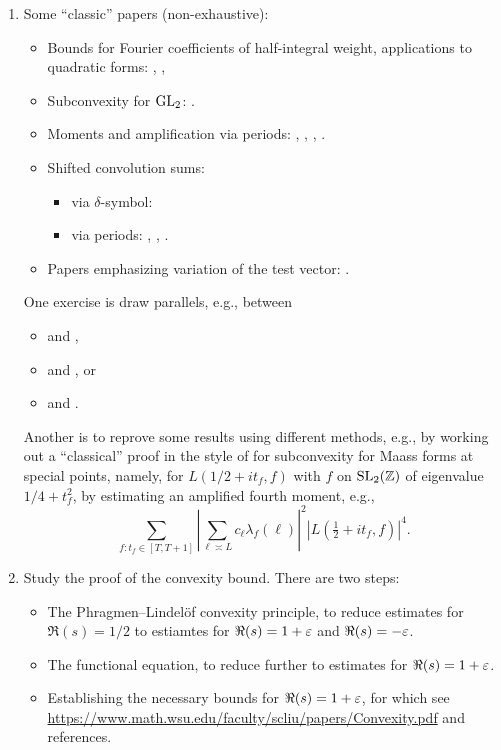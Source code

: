 \documentclass[reqno]{amsart} 
\begin{document}
\begin{enumerate}
\item Some ``classic'' papers (non-exhaustive):
  \begin{itemize}
  \item Bounds for Fourier coefficients of half-integral weight, applications to quadratic forms: \cite{MR870736}, \cite{MR931205}, \cite{MR1437494}
  \item Subconvexity for $\operatorname{GL}_2$: \cite{DFI93} \cite{DFI94} \cite{DFI01}.
  \item Moments and amplification via periods:  \cite{venkatesh-2005}, \cite{michel-2009}, \cite{iwan-sar}, \cite{MR780071}.
  \item Shifted convolution sums:
    \begin{itemize}
    \item via $\delta$-symbol: \cite{DFI93}
    \item via periods: \cite{Sar01}, \cite{MR2437682}, \cite{2024arXiv2404.10692}.
    \end{itemize}
  \item Papers emphasizing variation of the test vector:   \cite{MR2373356, MR2726097, venkatesh-2005}.
  \end{itemize}
  One exercise is draw parallels, e.g., between
  \begin{itemize}
  \item \cite[Thm 5.1]{michel-2009} and \cite{DFI93},
  \item \cite[\S4]{venkatesh-2005} and \cite{DFI94}, or
  \item \cite[Thm 5.2]{michel-2009} and \cite{DFI01}.
  \end{itemize}
  Another is to reprove some results using different methods, e.g., by working out a ``classical'' proof in the style of \cite{DFI01} for subconvexity for Maass forms at special points, namely, for $L(1/2 + i t_f, f)$ with $f$ on $\operatorname{SL}_2(\mathbb{Z})$ of eigenvalue $1/4 + t_f^2$, by estimating an amplified fourth moment, e.g.,
  \begin{equation*}
    \sum_{f : t_f \in [T, T+1]}
    \left| \sum_{\ell \asymp L}
      c_{\ell}   \lambda_f(\ell)\right|^2
    \left| L(\tfrac{1}{2} + i t_f, f) \right|^4.    
  \end{equation*}

\item Study the proof of the convexity bound.  There are two steps:
  \begin{itemize}
  \item The Phragmen--Lindel\"{o}f convexity principle, to reduce estimates for $\Re(s) = 1/2$ to estiamtes for $\Re(s) = 1 + \varepsilon$ and $\Re(s) = - \varepsilon$.
  \item The functional equation, to reduce further to estimates for $\Re(s) = 1 + \varepsilon$.
  \item Establishing the necessary bounds for $\Re(s) = 1 + \varepsilon$, for which see \url{https://www.math.wsu.edu/faculty/scliu/papers/Convexity.pdf} and references.
  \end{itemize}


\end{enumerate}
\end{document}
